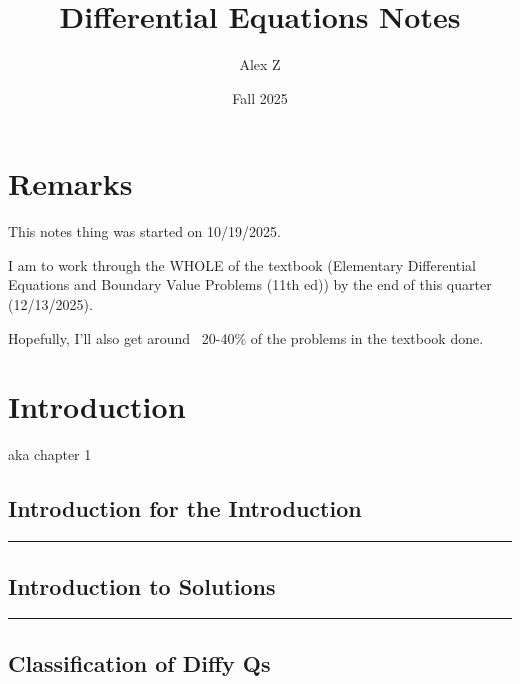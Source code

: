 \documentclass{article}
\title{Differential Equations Notes}
\author{Alex Z}
\date{Fall 2025}
\newcommand{\hr}{\rule{\linewidth}{1pt}}
\newcommand{\spacer}{\vspace{1cm} \hr \vspace{1cm}}
\theoremstyle{definition}
\begin{document}
\maketitle
\newpage

\tableofcontents
\newpage


\section*{Remarks}

This notes thing was started on 10/19/2025.

I am to work through the WHOLE of the textbook (Elementary Differential Equations and Boundary Value Problems (11th ed)) by the end of this quarter (12/13/2025).

Hopefully, I'll also get around ~20-40\% of the problems in the textbook done.

\newpage

\section{Introduction}

aka chapter 1

\subsection{Introduction for the Introduction}
 

\spacer

\subsection{Introduction to Solutions}


\spacer

\subsection{Classification of Diffy Qs}

\end{document}
